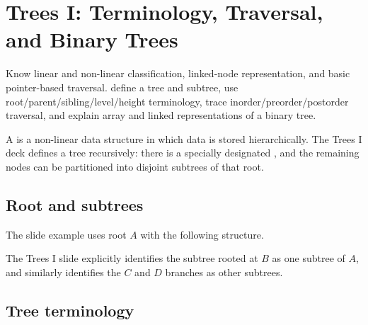 \chapter{Trees I: Terminology, Traversal, and Binary Trees}\label{ch:trees-i}

\chapterguide%
  {Know linear and non-linear classification, linked-node representation, and basic pointer-based traversal.}
  {define a tree and subtree, use root/parent/sibling/level/height terminology, trace inorder/preorder/postorder traversal, and explain array and linked representations of a binary tree.}

A  is a non-linear data structure in which data is stored hierarchically. The Trees I deck defines a tree recursively: there is a specially designated , and the remaining nodes can be partitioned into disjoint subtrees of that root.

\section{Root and subtrees}

The slide example uses root $A$ with the following structure.

\begin{mlfigure}
\end{mlfigure}

The Trees I slide explicitly identifies the subtree rooted at $B$ as one subtree of $A$, and similarly identifies the $C$ and $D$ branches as other subtrees.

\section{Tree terminology}

